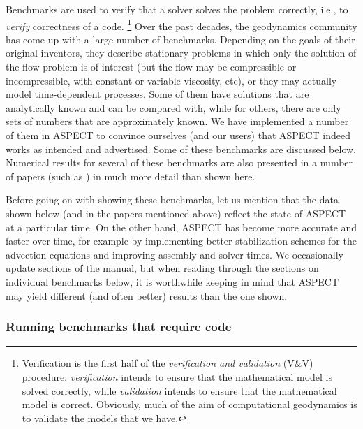 \documentclass{article}
\newcommand{\aspect}{\textsc{ASPECT}}
\begin{document}
Benchmarks are used to verify that a solver solves the problem correctly,
i.e., to \textit{verify} correctness of a code.%
\footnote{Verification is the first half of the \textit{verification and
    validation} (V\&V) procedure: \textit{verification} intends to ensure that the
  mathematical model is solved correctly, while \textit{validation} intends to
  ensure that the mathematical model is correct. Obviously, much of the aim of
  computational geodynamics is to validate the models that we have.}
Over the past decades, the geodynamics community has come up with a large
number of benchmarks. Depending on the goals of their original inventors, they
describe stationary problems in which only the solution of the flow problem is
of interest (but the flow may be compressible or incompressible, with constant
or variable viscosity, etc), or they may actually model time-dependent
processes. Some of them have solutions that are analytically known and can be
compared with, while for others, there are only sets of numbers that are
approximately known. We have implemented a number of them in \aspect{} to
convince ourselves (and our users) that \aspect{} indeed works as intended and
advertised. Some of these benchmarks are discussed below. Numerical results
for several of these benchmarks are also presented in a number of
papers (such as \cite{KHB12,heister_aspect_methods2,T15,FBTGS18}) in much more
detail than shown here.

Before going on with showing these benchmarks, let us mention that the
data shown below (and in the papers mentioned above) reflect the state
of \aspect{} at a particular time. On the other hand, \aspect{} has
become more accurate and faster over time, for example by implementing
better stabilization schemes for the advection equations and improving
assembly and solver times. We occasionally update sections of the
manual, but when reading through the sections on individual benchmarks
below, it is worthwhile keeping in mind that \aspect{} may yield
different (and often better) results than the one shown.


\subsubsection{Running benchmarks that require code}
\label{sec:benchmark-run}
\end{document}
